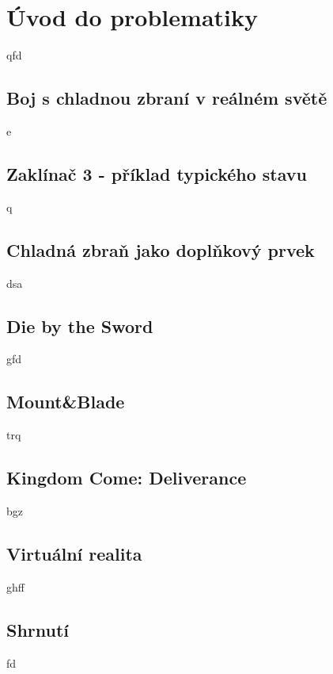 \chapter{Úvod do problematiky}
qfd

\section{Boj s chladnou zbraní v reálném světě}
e

\section{Zaklínač 3 - příklad typického stavu}
q

\section{Chladná zbraň jako doplňkový prvek}
dsa

\section{Die by the Sword}
gfd

\section{Mount\&Blade}
trq

\section{Kingdom Come: Deliverance}
bgz

\section{Virtuální realita}
ghff

\section{Shrnutí}
fd